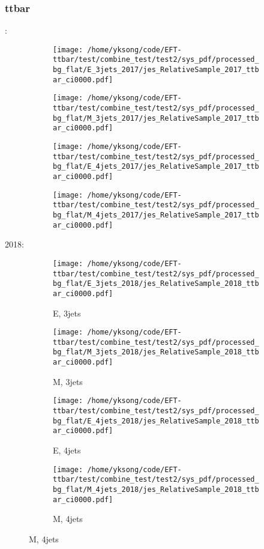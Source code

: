 \documentclass{beamer}
\begin{document}
\begin{frame}
\frametitle{ttbar}
\fontsize{5}{1}:
\begin{figure}
\centering
\begin{subfigure}[b]{0.24\textwidth}
\texttt{[image: /home/yksong/code/EFT-ttbar/test/combine\_test/test2/sys\_pdf/processed\_bg\_flat/E\_3jets\_2017/jes\_RelativeSample\_2017\_ttbar\_ci0000.pdf]}
\end{subfigure}
\begin{subfigure}[b]{0.24\textwidth}
\texttt{[image: /home/yksong/code/EFT-ttbar/test/combine\_test/test2/sys\_pdf/processed\_bg\_flat/M\_3jets\_2017/jes\_RelativeSample\_2017\_ttbar\_ci0000.pdf]}
\end{subfigure}
\begin{subfigure}[b]{0.24\textwidth}
\texttt{[image: /home/yksong/code/EFT-ttbar/test/combine\_test/test2/sys\_pdf/processed\_bg\_flat/E\_4jets\_2017/jes\_RelativeSample\_2017\_ttbar\_ci0000.pdf]}
\end{subfigure}
\begin{subfigure}[b]{0.24\textwidth}
\texttt{[image: /home/yksong/code/EFT-ttbar/test/combine\_test/test2/sys\_pdf/processed\_bg\_flat/M\_4jets\_2017/jes\_RelativeSample\_2017\_ttbar\_ci0000.pdf]}
\end{subfigure}
\end{figure}
2018:
\begin{figure}
\centering
\begin{subfigure}[b]{0.24\textwidth}
\texttt{[image: /home/yksong/code/EFT-ttbar/test/combine\_test/test2/sys\_pdf/processed\_bg\_flat/E\_3jets\_2018/jes\_RelativeSample\_2018\_ttbar\_ci0000.pdf]}
\captionsetup{font=tiny}
\caption{E, 3jets}
\end{subfigure}
\begin{subfigure}[b]{0.24\textwidth}
\texttt{[image: /home/yksong/code/EFT-ttbar/test/combine\_test/test2/sys\_pdf/processed\_bg\_flat/M\_3jets\_2018/jes\_RelativeSample\_2018\_ttbar\_ci0000.pdf]}
\captionsetup{font=tiny}
\caption{M, 3jets}
\end{subfigure}
\begin{subfigure}[b]{0.24\textwidth}
\texttt{[image: /home/yksong/code/EFT-ttbar/test/combine\_test/test2/sys\_pdf/processed\_bg\_flat/E\_4jets\_2018/jes\_RelativeSample\_2018\_ttbar\_ci0000.pdf]}
\captionsetup{font=tiny}
\caption{E, 4jets}
\end{subfigure}
\begin{subfigure}[b]{0.24\textwidth}
\texttt{[image: /home/yksong/code/EFT-ttbar/test/combine\_test/test2/sys\_pdf/processed\_bg\_flat/M\_4jets\_2018/jes\_RelativeSample\_2018\_ttbar\_ci0000.pdf]}
\captionsetup{font=tiny}
\caption{M, 4jets}
\end{subfigure}
\end{figure}
\end{frame}
\end{document}
